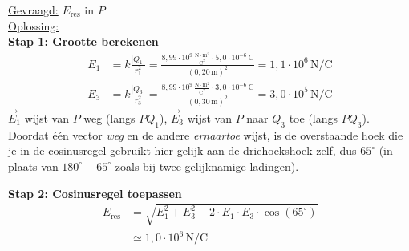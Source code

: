 \documentclass{ximera}
\begin{document}
\begin{exercise}
\begin{solution}
        \underline{Gevraagd:} $E_{\text{res}}$ in $P$\\

        \underline{Oplossing:}\\
        \textbf{Stap 1: Grootte berekenen}
        \begin{align*}
            E_{1} &= k \frac{|Q_{1}|}{r_{1}^{2}} = \frac{8{,}99 \cdot 10^{9} \, \mathrm{\frac{N \cdot m^2}{C^2}} \cdot 5{,}0 \cdot 10^{-6} \, \mathrm{C}}{(0{,}20 \, \mathrm{m})^{2}} = 1{,}1 \cdot 10^{6} \, \mathrm{N/C} \\
            E_{3} &= k \frac{|Q_{3}|}{r_{3}^{2}} = \frac{8{,}99 \cdot 10^{9} \, \mathrm{\frac{N \cdot m^2}{C^2}} \cdot 3{,}0 \cdot 10^{-6} \, \mathrm{C}}{(0{,}30 \, \mathrm{m})^{2}} = 3{,}0 \cdot 10^{5} \, \mathrm{N/C}
        \end{align*}
        $\vec{E}_1$ wijst van $P$ weg (langs $PQ_1$), $\vec{E}_3$ wijst van $P$ naar $Q_3$ toe (langs $PQ_3$). Doordat één vector \textit{weg} en de andere \textit{ernaartoe} wijst, is de overstaande hoek die je in de cosinusregel gebruikt hier gelijk aan de driehoekshoek zelf, dus $65^\circ$ (in plaats van $180^\circ-65^\circ$ zoals bij twee gelijknamige ladingen).

        \textbf{Stap 2: Cosinusregel toepassen}
        \begin{align*}
            E_{\text{res}} &= \sqrt{E_1^{2} + E_3^{2} - 2 \cdot E_1 \cdot E_3 \cdot \cos(65^\circ)} \\
                            &\simeq \boxed{1{,}0 \cdot 10^{6} \, \mathrm{N/C}}
        \end{align*}
    \end{solution}
\end{exercise}
\end{document}
